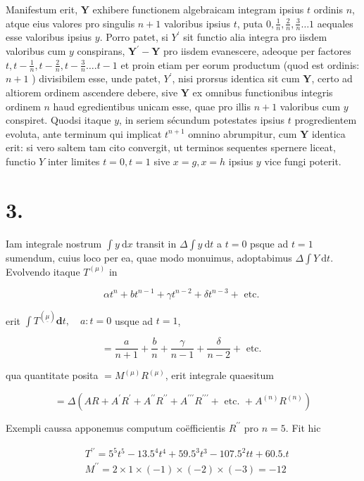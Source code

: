 \documentclass[10pt]{article}
\begin{document}
Manifestum erit, \(\boldsymbol{Y}\) exhibere functionem algebraicam integram ipsius \(t\) ordinis \(n\), atque eius valores pro singulis \(n+1\) valoribus ipsius \(t\), puta \(0, \frac{1}{n}, \frac{2}{n}, \frac{3}{n} \ldots 1\) aequales esse valoribus ipsius \(y\). Porro patet, si \(Y^{\prime}\) sit functio alia integra pro iisdem valoribus cum \(y\) conspirans, \(\boldsymbol{Y}^{\prime}-\boldsymbol{Y}\) pro iisdem evanescere, adeoque per factores \(t, t-\frac{1}{n}, t-\frac{2}{n}, t-\frac{3}{n} \ldots . t-1\) et proin etiam per eorum productum (quod est ordinis: \(n+1\) ) divisibilem esse, unde patet, \(Y^{\prime}\), nisi prorsus identica sit cum \(\boldsymbol{Y}\), certo ad altiorem ordinem ascendere debere, sive \(\boldsymbol{Y}\) ex omnibus functionibus integris ordinem \(n\) haud egredientibus unicam esse, quae pro illis \(n+1\) valoribus cum \(y\) conspiret. Quodsi itaque \(y\), in seriem sécundum potestates ipsius \(t\) progredientem evoluta, ante terminum qui implicat \(t^{n+1}\) omnino abrumpitur, cum \(\boldsymbol{Y}\) identica erit: si vero saltem tam cito convergit, ut terminos sequentes spernere liceat, functio \(Y\) inter limites \(t=0, t=1\) sive \(x=g, x=h\) ipsius \(y\) vice fungi poterit.

\section*{3.}
Iam integrale nostrum \(\int y \mathrm{~d} x\) transit in \(\Delta \int y \mathrm{~d} t\) a \(t=0\) psque ad \(t=1\) sumendum, cuius loco per ea, quae modo monuimus, adoptabimus \(\Delta \int Y \mathrm{~d} t\). Evolvendo itaque \(T^{(\mu)}\) in

\[
\alpha t^{n}+b t^{n-1}+\gamma t^{n-2}+\delta t^{n-3}+\text { etc. }
\]

erit \(\int T^{(\underline{\mu})} \mathbf{d} t, \quad a: t=0\) usque ad \(t=1\),

\[
=\frac{a}{n+1}+\frac{b}{n}+\frac{\gamma}{n-1}+\frac{\delta}{n-2}+\text { etc. }
\]

qua quantitate posita \(=M^{(\mu)} R^{(\mu)}\), erit integrale quaesitum

\[
=\Delta\left(A R+A^{\prime} R^{\prime}+A^{\prime \prime} R^{\prime \prime}+A^{\prime \prime \prime} R^{\prime \prime \prime}+\text { etc. }+A^{(n)} R^{(n)}\right)
\]

Exempli caussa apponemus computum coëfficientis \(R^{\prime \prime}\) pro \(n=5\). Fit hic

\[
\begin{aligned}
& T^{\prime \prime}=5^{5} t^{5}-13.5^{4} t^{4}+59.5^{3} t^{3}-107.5^{2} t t+60.5 . t \\
& M^{\prime \prime}=2 \times 1 \times(-1) \times(-2) \times(-3)=-12
\end{aligned}
\]
\end{document}
